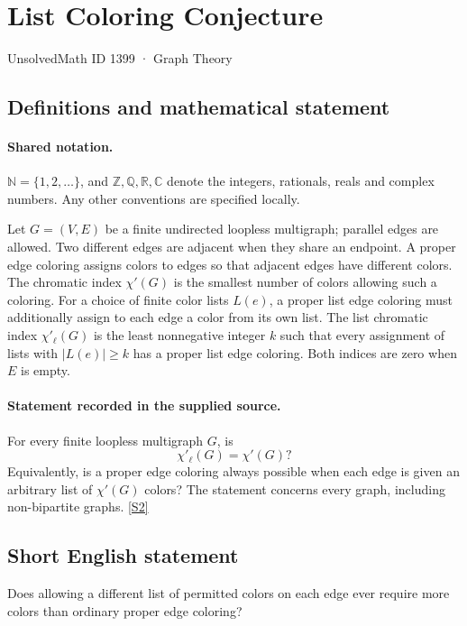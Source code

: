 \documentclass[11pt]{article}
\newcommand{\sref}[2]{\hyperlink{source:#1:#2}{[S#2]}}
\begin{document}
\setcounter{section}{1398}
\section{List Coloring Conjecture}\label{1399}
{\small\sffamily UnsolvedMath ID 1399 · Graph Theory}
\subsection{Definitions and mathematical statement}

\paragraph{Shared notation.}$\mathbb N=\{1,2,\ldots\}$, and $\mathbb Z,\mathbb Q,\mathbb R,\mathbb C$ denote the integers, rationals, reals and complex numbers. Any other conventions are specified locally.


Let $G=(V,E)$ be a finite undirected loopless multigraph; parallel edges are allowed. Two different edges are adjacent when they share an endpoint. A proper edge coloring assigns colors to edges so that adjacent edges have different colors. The chromatic index $\chi'(G)$ is the smallest number of colors allowing such a coloring. For a choice of finite color lists $L(e)$, a proper list edge coloring must additionally assign to each edge a color from its own list. The list chromatic index $\chi'_{\ell}(G)$ is the least nonnegative integer $k$ such that every assignment of lists with $|L(e)|\ge k$ has a proper list edge coloring. Both indices are zero when $E$ is empty.
\paragraph{Statement recorded in the supplied source.}
For every finite loopless multigraph $G$, is
\[
 \chi'_{\ell}(G)=\chi'(G)?
\]
Equivalently, is a proper edge coloring always possible when each edge is given an arbitrary list of $\chi'(G)$ colors? The statement concerns every graph, including non-bipartite graphs. \sref{1399}{2}
\subsection{Short English statement}
Does allowing a different list of permitted colors on each edge ever require more colors than ordinary proper edge coloring?
\end{document}

